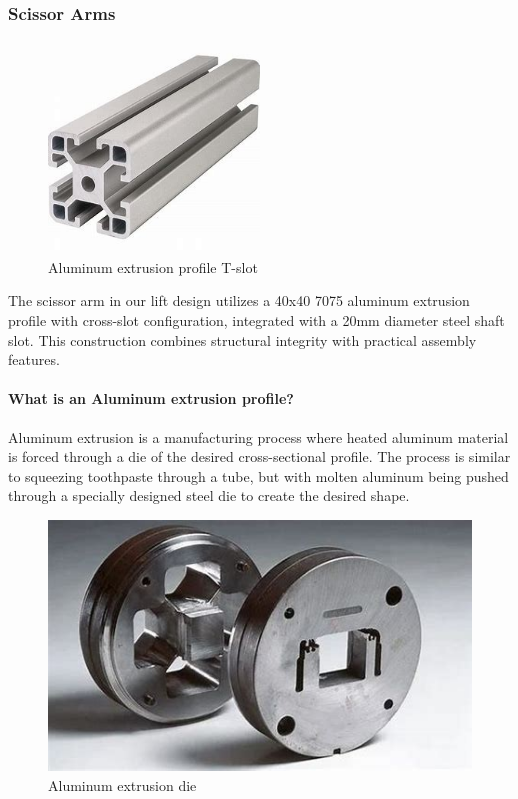 \documentclass[../../main]{subfiles}
\begin{document}
\subsubsection{Scissor Arms}
\begin{figure}[h!]
  \centering
  \includegraphics[width=0.5\textwidth]{img/n1.jpg}
  \caption{Aluminum extrusion profile T-slot}
\end{figure}

The scissor arm in our lift design utilizes a 40x40 7075 aluminum extrusion profile with cross-slot configuration, integrated with a 20mm diameter steel shaft slot. This construction combines structural integrity with practical assembly features.

\paragraph{What is an Aluminum extrusion profile?}

Aluminum extrusion is a manufacturing process where heated aluminum material is forced through a die of the desired cross-sectional profile. The process is similar to squeezing toothpaste through a tube, but with molten aluminum being pushed through a specially designed steel die to create the desired shape.

\begin{figure}[h!]
  \centering
  \includegraphics[width=\textwidth]{img/n2.jpg}
  \caption{Aluminum extrusion die}
\end{figure}
\end{document}
